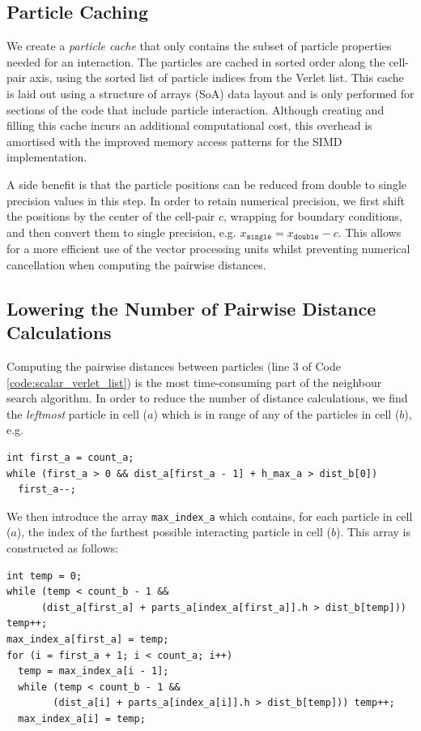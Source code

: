\documentclass{IOS-Book-Article}
\begin{document}
\subsection{Particle Caching}
\label{sec:particle_caching}

We create a {\em particle cache} that only contains the subset of particle properties needed for an interaction. The particles are cached in sorted order along the cell-pair axis, using the sorted list of particle indices from the Verlet list. This cache is laid out using a structure of arrays (SoA) data layout and is only performed for sections of the code that include particle interaction. Although creating and filling this cache incurs an additional computational cost, this overhead is amortised with the improved memory access patterns for the SIMD implementation.

A side benefit is that the particle positions can be reduced from double to single precision values in this step. In order to retain numerical precision, we first shift the positions by the center of the cell-pair $c$, wrapping for boundary conditions, and then convert them to single precision, e.g. $x_{\mathtt{single}} = x_{\mathtt{double}} - c$. This allows for a more efficient use of the vector processing units whilst preventing numerical cancellation when computing the pairwise distances.

\subsection{Lowering the Number of Pairwise Distance Calculations}
\label{sec:max_d}

Computing the pairwise distances between particles (line 3 of Code \ref{code:scalar_verlet_list}) is the most time-consuming part of the neighbour search algorithm. In order to reduce the number of distance calculations, we find the {\em leftmost} particle in cell ($a$) which is in range of any of the particles in cell ($b$), e.g.

\begin{lstlisting}
int first_a = count_a;
while (first_a > 0 && dist_a[first_a - 1] + h_max_a > dist_b[0])
  first_a--;
\end{lstlisting}

We then introduce the array {\tt max\_index\_a} which contains, for each particle in cell ($a$), the index of the farthest possible interacting particle in cell ($b$). This array is constructed as follows:

\begin{lstlisting}
int temp = 0;
while (temp < count_b - 1 && 
      (dist_a[first_a] + parts_a[index_a[first_a]].h > dist_b[temp])) temp++;
max_index_a[first_a] = temp;
for (i = first_a + 1; i < count_a; i++)
  temp = max_index_a[i - 1];
  while (temp < count_b - 1 && 
        (dist_a[i] + parts_a[index_a[i]].h > dist_b[temp])) temp++;
  max_index_a[i] = temp;
\end{lstlisting}
\end{document}
